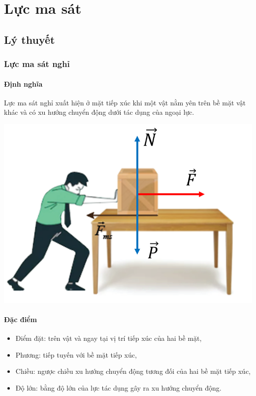 \let\lesson\undefined
\newcommand{\lesson}{\phantomlesson{Bài 12: Một số lực trong thực tiễn}}
\chapter[Lực ma sát]{Lực ma sát}
\setcounter{section}{0}
\section{Lý thuyết}
\subsection{Lực ma sát nghỉ}
\subsubsection{Định nghĩa}
Lực ma sát nghỉ xuất hiện ở mặt tiếp xúc khi một vật nằm yên trên bề mặt vật khác và có xu hướng chuyển động dưới tác dụng của ngoại lực.
\begin{center}
	\includegraphics[width=0.4\linewidth]{../figs/VN10-2023-PH-TP019-1}
\end{center}
\subsubsection{Đặc điểm}
\begin{itemize} 
	\item Điểm đặt: trên vật và ngay tại vị trí tiếp xúc của hai bề mặt, 
	\item Phương: tiếp tuyến với bề mặt tiếp xúc,
	\item Chiều: ngược chiều xu hướng chuyển động tương đối của hai bề mặt tiếp xúc,
	\item Độ lớn: bằng độ lớn của lực tác dụng gây ra xu hướng chuyển động.
\end{itemize}
